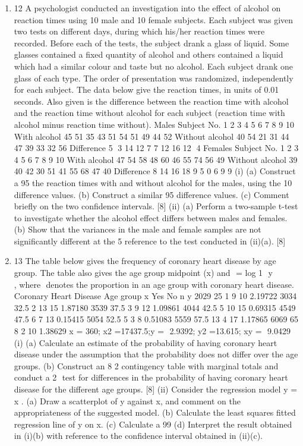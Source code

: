 \documentclass[a4paper,12pt]{article}
\begin{document}
\begin{enumerate}
\item 12 A psychologist conducted an investigation into the effect of alcohol on reaction times
using 10 male and 10 female subjects. Each subject was given two tests on different
days, during which his/her reaction times were recorded.
Before each of the tests, the subject drank a glass of liquid. Some glasses contained a
fixed quantity of alcohol and others contained a liquid which had a similar colour and
taste but no alcohol. Each subject drank one glass of each type. The order of
presentation was randomized, independently for each subject.
The data below give the reaction times, in units of 0.01 seconds. Also given is the
difference between the reaction time with alcohol and the reaction time without
alcohol for each subject (reaction time with alcohol minus reaction time without).
Males
Subject No. 1 2 3 4 5 6 7 8 9 10
With alcohol 45 51 35 43 51 54 51 49 44 52
Without alcohol 40 54 21 31 44 47 39 33 32 56
Difference 5 3 14 12 7 7 12 16 12 4
Females
Subject No. 1 2 3 4 5 6 7 8 9 10
With alcohol 47 54 58 48 60 46 55 74 56 49
Without alcohol 39 40 42 30 51 41 55 68 47 40
Difference 8 14 16 18 9 5 0 6 9 9
(i) (a) Construct a 95%
the reaction times with and without alcohol for the males, using the 10
difference values.
(b) Construct a similar 95%
difference values.
(c) Comment briefly on the two confidence intervals. [8]
(ii) (a) Perform a two-sample t-test to investigate whether the alcohol effect
differs between males and females.
(b) Show that the variances in the male and female samples are not
significantly different at the 5%
reference to the test conducted in (ii)(a). [8]
\item 13 The table below gives the frequency of coronary heart disease by age group. The
table also gives the age group midpoint (x) and

= log 1 
y
  
     
, where  denotes the
proportion in an age group with coronary heart disease.
Coronary Heart
Disease
Age group x Yes No n y
2029 25 1 9 10 2.19722
3034 32.5 2 13 15 1.87180
3539 37.5 3 9 12 1.09861
4044 42.5 5 10 15 0.69315
4549 47.5 6 7 13 0.15415
5054 52.5 5 3 8 0.51083
5559 57.5 13 4 17 1.17865
6069 65 8 2 10 1.38629
x = 360; x2 =17437.5;y =  2.9392; y2 =13.615; xy =  9.0429
(i) (a) Calculate an estimate of the probability of having coronary heart
disease under the assumption that the probability does not differ over
the age groups.
(b) Construct an 8 	 2 contingency table with marginal totals and conduct
a 2
 test for differences in the probability of having coronary heart
disease for the different age groups. [8]
(ii) Consider the regression model y =  x .
(a) Draw a scatterplot of y against x, and comment on the appropriateness
of the suggested model.
(b) Calculate the least squares fitted regression line of y on x.
(c) Calculate a 99%
(d) Interpret the result obtained in (i)(b) with reference to the confidence
interval obtained in (ii)(c). 
\end{enumerate}
\end{document}
